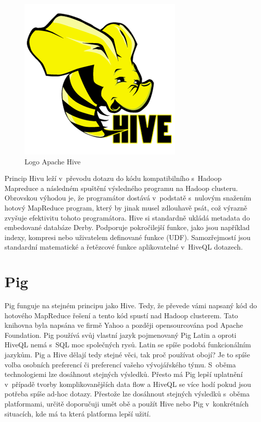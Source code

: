 \begin{figure}
  \centering
    \includegraphics[scale=0.5]{images/hive_logo}
\caption{Logo Apache Hive}

\end{figure}

Princip Hivu leží v~převodu dotazu do kódu kompatibilního s~Hadoop Mapreduce a následném spuštění výsledného programu na Hadoop clusteru. Obrovskou výhodou je, že programátor dostává v~podstatě s~nulovým snažením hotový MapReduce program, který by jinak musel zdlouhavě psát, což výrazně zvyšuje efektivitu tohoto programátora. Hive si standardně ukládá metadata do embedované databáze Derby. Podporuje pokročilejší funkce, jako jsou například indexy, kompresi nebo uživatelem definované funkce (UDF). Samozřejmostí jsou standardní matematické a řetězcové funkce aplikovatelné v~HiveQL dotazech. 



\section{Pig}


Pig funguje na stejném principu jako Hive. Tedy, že převede vámi napsaný kód do hotového MapReduce řešení a tento kód spustí nad Hadoop clusterem. Tato knihovna byla napsána ve firmě Yahoo a později opensourcována pod Apache Foundation. Pig používá svůj vlastní jazyk pojmenovaný Pig Latin a oproti HiveQL nemá s~SQL moc společných rysů. Latin se spíše podobá funkcionálním jazykům. Pig a Hive dělají tedy stejné věci, tak proč používat obojí? Je to spíše volba osobních preferencí či preferencí vašeho vývojářského týmu. S~oběma technologiemi lze dosáhnout stejných výsledků. Přesto má Pig lepší uplatnění v~případě tvorby komplikovanějších data flow a HiveQL se více hodí pokud jsou potřeba spíše ad-hoc dotazy. Přestože lze dosáhnout stejných výsledků s~oběma platformami, určitě doporučuji umět obě a použít Hive nebo Pig v~konkrétních situacích, kde má ta která platforma lepší užití. 



